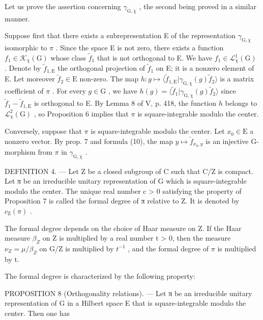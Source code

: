 Let us prove the assertion concerning \(\gamma_{\mathrm{G},\overline{\chi}}\) , the second being proved in a similar manner.

 Suppose first that there exists a subrepresentation E of the representation \(\gamma_{\mathrm{G},\overline{\chi}}\) isomorphic to \(\pi\) . Since the space E is not zero, there exists a function \(f_1 \in \mathcal{K}_{\overline{\chi}}(\mathrm{G})\) whose class \(\widetilde{f}_1\) that is not orthogonal to E. We have \(f_1 \in \mathcal{L}_{\overline{\chi}}^1 (\mathrm{G})\) . Denote by \(\widetilde{f}_{1,\mathrm{E}}\) the orthogonal projection of \(\widetilde{f}_1\) on E; it is a nonzero element of E. Let moreover \(\widetilde{f}_2 \in \mathrm{E}\) non-zero. The map \(h: g \mapsto \langle \widetilde{f}_{1,\mathrm{E}} | \gamma_{\mathrm{G},\overline{\chi}}(g)\widetilde{f}_2 \rangle\) is a matrix coefficient of \(\pi\) . For every \(g \in \mathrm{G}\) , we have \(h(g) = \langle \widetilde{f}_1 | \gamma_{\mathrm{G},\overline{\chi}}(g)\widetilde{f}_2 \rangle\) since \(\widetilde{f}_1 - \widetilde{f}_{1,\mathrm{E}}\) is orthogonal to E. By Lemma 8 of V, p. 418, the function \(h\) belongs to \(\mathcal{L}_{\chi}^{2}(\mathrm{G})\) , so Proposition 6 implies that \(\pi\) is square-integrable modulo the center.

Conversely, suppose that \(\pi\) is square-integrable modulo the center. Let \(x_0 \in \mathrm{E}\) a nonzero vector. By prop. 7 and formula (10), the map \(y \mapsto \check{f}_{x_0,y}\) is an injective G-morphism from \(\pi\) in \(\gamma_{\mathrm{G},\overline{\chi}}\) .

DEFINITION 4. --- Let Z be a closed subgroup of C such that C/Z is compact. Let π be an irreducible unitary representation of G which is square-integrable modulo the center. The unique real number c \textgreater{} 0 satisfying the property of Proposition 7 is called the formal degree of π relative to Z. It is denoted by \(c_{\mathrm{Z}}(\pi)\) .

The formal degree depends on the choice of Haar measure on Z. If the Haar measure \(\beta_{Z}\) on Z is multiplied by a real number t \textgreater{} 0, then the measure \(\nu_{Z} = \mu/\beta_{Z}\) on G/Z is multiplied by \(t^{-1}\) , and the formal degree of \(\pi\) is multiplied by t.

The formal degree is characterized by the following property:

PROPOSITION 8 (Orthogonality relations). --- Let π be an irreducible unitary representation of G in a Hilbert space E that is square-integrable modulo the center. Then one has

